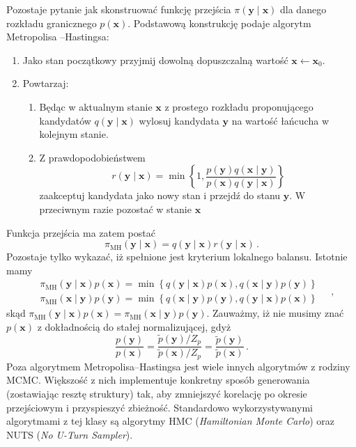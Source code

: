 \documentclass{myclass}
\begin{document}
Pozostaje pytanie jak skonstruować funkcję przejścia \(\pi(\mathbf{y} \mid \mathbf{x})\) dla danego
rozkładu granicznego \(p(\mathbf{x})\). Podstawową konstrukcję podaje algorytm
Metropolisa
--Hastingsa:
\begin{enumerate}
    \item Jako stan początkowy przyjmij dowolną dopuszczalną wartość \(\mathbf{x} \leftarrow
    \mathbf{x}_0\).
    \item Powtarzaj:
    \begin{enumerate}
        \item Będąc w aktualnym stanie \(\mathbf{x}\) z prostego rozkładu proponującego kandydatów
        \(q(\mathbf{y} \mid \mathbf{x})\) wylosuj kandydata \(\mathbf{y}\) na wartość łańcucha w
        kolejnym stanie.
        \item Z prawdopodobieństwem
        \begin{equation*}
            r(\mathbf{y} \mid \mathbf{x}) = \min\left\{1, \frac{p(\mathbf{y})q(\mathbf{x} \mid \mathbf{y})}{p(\mathbf{x})q(\mathbf{y} \mid \mathbf{x})}\right\}
        \end{equation*}
        zaakceptuj kandydata jako nowy stan i przejdź do stanu \(\mathbf{y}\). W przeciwnym razie
        pozostać w stanie \(\mathbf{x}\)
    \end{enumerate}
\end{enumerate}
Funkcja przejścia ma zatem postać
\begin{equation*}
    \pi_\text{MH}(\mathbf{y}\mid\mathbf{x}) = q(\mathbf{y} \mid \mathbf{x}) r(\mathbf{y} \mid \mathbf{x})\,.
\end{equation*}
Pozostaje tylko wykazać, iż spełnione jest kryterium lokalnego balansu. Istotnie mamy
\begin{equation*}
    \begin{split}
        &\pi_\text{MH}(\mathbf{y}\mid\mathbf{x})p(\mathbf{x}) = \min\left\{q(\mathbf{y}\mid\mathbf{x})p(\mathbf{x}), q(\mathbf{x}\mid\mathbf{y})p(\mathbf{y})\right\}\\
        &\pi_\text{MH}(\mathbf{x}\mid\mathbf{y})p(\mathbf{y}) = \min\left\{q(\mathbf{x}\mid\mathbf{y})p(\mathbf{y}), q(\mathbf{y}\mid\mathbf{x})p(\mathbf{x})\right\}
    \end{split}\quad,
\end{equation*}
skąd \(\pi_\text{MH}(\mathbf{y}\mid\mathbf{x})p(\mathbf{x}) =
\pi_\text{MH}(\mathbf{x}\mid\mathbf{y})p(\mathbf{y})\). Zauważmy, iż nie musimy znać
\(p(\mathbf{x})\) z dokładnością do stałej normalizującej, gdyż
\begin{equation*}
    \frac{p(\mathbf{y})}{p(\mathbf{x})} = \frac{\tilde{p}(\mathbf{y})/Z_p}{\tilde{p}(\mathbf{x})/Z_p} =  \frac{\tilde{p}(\mathbf{y})}{\tilde{p}(\mathbf{x})}\,.
\end{equation*}
Poza algorytmem Metropolisa--Hastingsa jest wiele innych algorytmów z rodziny MCMC. Większość z nich
implementuje konkretny sposób generowania (zostawiając resztę struktury) tak, aby zmniejszyć
korelację po okresie przejściowym i przyspieszyć zbieżność. Standardowo wykorzystywanymi algorytmami
z tej klasy są algorytmy HMC (\textit{Hamiltonian Monte Carlo}) oraz NUTS (\textit{No U-Turn
Sampler}). 
\end{document}
